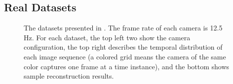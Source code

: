 \subsection{Real Datasets}
\begin{figure}
\centering
{}

\caption{The datasets presented in \cite{ballan2010unstructured}. The frame rate of each camera is 12.5 Hz. For each dataset, the top left two show the camera configuration, the top right describes the temporal distribution of each image sequence (a colored grid means the camera of the same color captures one frame at a time instance), and the bottom shows sample reconstruction results. }
\label{fig:onlinedata}
\end{figure}

